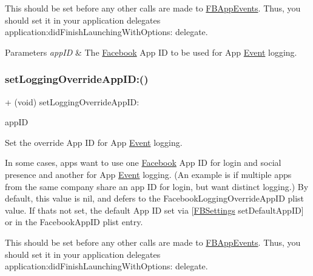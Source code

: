 This should be set before any other calls are made to {\ttfamily \hyperlink{interfaceFBAppEvents}{F\+B\+App\+Events}}. Thus, you should set it in your application delegate\textquotesingle{}s {\ttfamily application\+:did\+Finish\+Launching\+With\+Options\+:} delegate.


\begin{DoxyParams}{Parameters}
{\em app\+ID} & The \hyperlink{interfaceFacebook}{Facebook} App ID to be used for App \hyperlink{classEvent}{Event} logging. \\
\hline
\end{DoxyParams}
\mbox{\label{interfaceFBAppEvents_a3f9d06a1e8b3d482efc5c438827fbc6e}} 
\subsubsection{\texorpdfstring{set\+Logging\+Override\+App\+I\+D\+:()}{setLoggingOverrideAppID:()}\hspace{0.1cm}{\footnotesize\ttfamily [2/5]}}
{\footnotesize\ttfamily + (void) set\+Logging\+Override\+App\+I\+D\+: \begin{DoxyParamCaption}\item[{(N\+S\+String $\ast$)}]{app\+ID }\end{DoxyParamCaption}}

Set the \textquotesingle{}override\textquotesingle{} App ID for App \hyperlink{classEvent}{Event} logging.

In some cases, apps want to use one \hyperlink{interfaceFacebook}{Facebook} App ID for login and social presence and another for App \hyperlink{classEvent}{Event} logging. (An example is if multiple apps from the same company share an app ID for login, but want distinct logging.) By default, this value is {\ttfamily nil}, and defers to the {\ttfamily Facebook\+Logging\+Override\+App\+ID} plist value. If that\textquotesingle{}s not set, the default App ID set via \mbox{[}\hyperlink{interfaceFBSettings}{F\+B\+Settings} set\+Default\+App\+ID\mbox{]} or in the {\ttfamily Facebook\+App\+ID} plist entry.

This should be set before any other calls are made to {\ttfamily \hyperlink{interfaceFBAppEvents}{F\+B\+App\+Events}}. Thus, you should set it in your application delegate\textquotesingle{}s {\ttfamily application\+:did\+Finish\+Launching\+With\+Options\+:} delegate.


